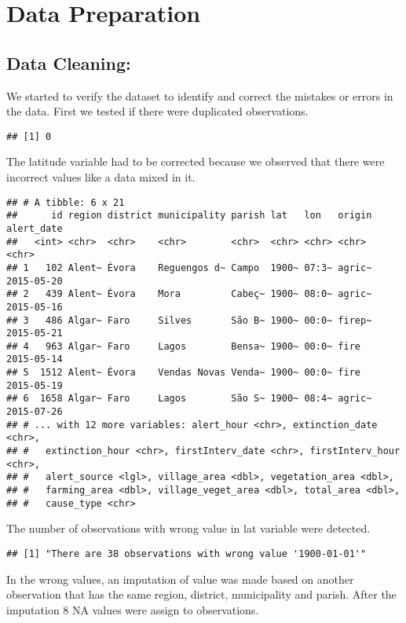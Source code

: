 \documentclass[
  12pt,
]{report}
\begin{document}
\hypertarget{data-preparation}{%
\chapter{Data Preparation}\label{data-preparation}}

\hypertarget{data-cleaning}{%
\section{Data Cleaning:}\label{data-cleaning}}

We started to verify the dataset to identify and correct the mistakes or
errors in the data. First we tested if there were duplicated
observations.

\begin{verbatim}
## [1] 0
\end{verbatim}

The latitude variable had to be corrected because we observed that there
were incorrect values like a data mixed in it.

\begin{verbatim}
## # A tibble: 6 x 21
##      id region district municipality parish lat   lon   origin alert_date
##   <int> <chr>  <chr>    <chr>        <chr>  <chr> <chr> <chr>  <chr>     
## 1   102 Alent~ Évora    Reguengos d~ Campo  1900~ 07:3~ agric~ 2015-05-20
## 2   439 Alent~ Évora    Mora         Cabeç~ 1900~ 08:0~ agric~ 2015-05-16
## 3   486 Algar~ Faro     Silves       São B~ 1900~ 00:0~ firep~ 2015-05-21
## 4   963 Algar~ Faro     Lagos        Bensa~ 1900~ 00:0~ fire   2015-05-14
## 5  1512 Alent~ Évora    Vendas Novas Venda~ 1900~ 00:0~ fire   2015-05-19
## 6  1658 Algar~ Faro     Lagos        São S~ 1900~ 08:4~ agric~ 2015-07-26
## # ... with 12 more variables: alert_hour <chr>, extinction_date <chr>,
## #   extinction_hour <chr>, firstInterv_date <chr>, firstInterv_hour <chr>,
## #   alert_source <lgl>, village_area <dbl>, vegetation_area <dbl>,
## #   farming_area <dbl>, village_veget_area <dbl>, total_area <dbl>,
## #   cause_type <chr>
\end{verbatim}

The number of observations with wrong value in lat variable were
detected.

\begin{verbatim}
## [1] "There are 38 observations with wrong value '1900-01-01'"
\end{verbatim}

In the wrong values, an imputation of value was made based on another
observation that has the same region, district, municipality and parish.
After the imputation 8 NA values were assign to observations.
\end{document}
